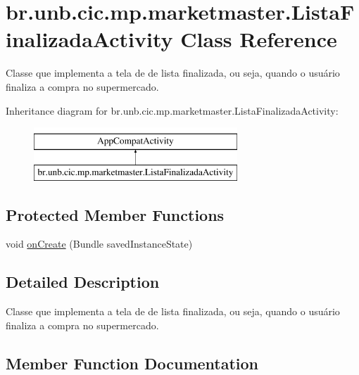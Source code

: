 \hypertarget{classbr_1_1unb_1_1cic_1_1mp_1_1marketmaster_1_1ListaFinalizadaActivity}{}\section{br.\+unb.\+cic.\+mp.\+marketmaster.\+Lista\+Finalizada\+Activity Class Reference}
\label{classbr_1_1unb_1_1cic_1_1mp_1_1marketmaster_1_1ListaFinalizadaActivity}


Classe que implementa a tela de de lista finalizada, ou seja, quando o usuário finaliza a compra no supermercado.  


Inheritance diagram for br.\+unb.\+cic.\+mp.\+marketmaster.\+Lista\+Finalizada\+Activity\+:\begin{figure}[H]
\begin{center}
\leavevmode
\includegraphics[height=2.000000cm]{classbr_1_1unb_1_1cic_1_1mp_1_1marketmaster_1_1ListaFinalizadaActivity}
\end{center}
\end{figure}
\subsection*{Protected Member Functions}
\begin{DoxyCompactItemize}
\item 
void \mbox{\hyperlink{classbr_1_1unb_1_1cic_1_1mp_1_1marketmaster_1_1ListaFinalizadaActivity_aef918f2e16e77e3ac86926d7381ec3ce}{on\+Create}} (Bundle saved\+Instance\+State)
\end{DoxyCompactItemize}


\subsection{Detailed Description}
Classe que implementa a tela de de lista finalizada, ou seja, quando o usuário finaliza a compra no supermercado. 

\subsection{Member Function Documentation}
\mbox{\label{classbr_1_1unb_1_1cic_1_1mp_1_1marketmaster_1_1ListaFinalizadaActivity_aef918f2e16e77e3ac86926d7381ec3ce}} 
